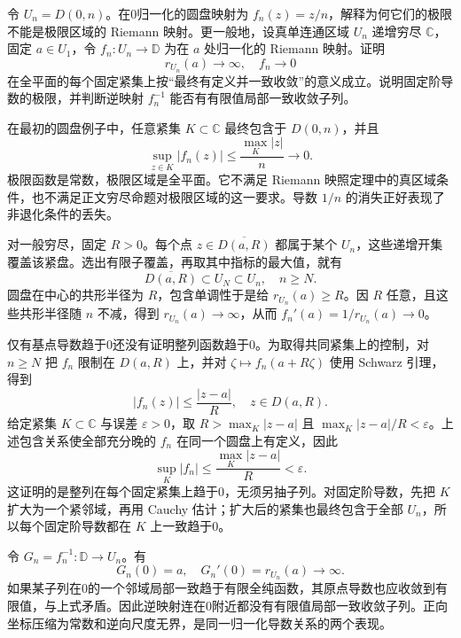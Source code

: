 \begin{exercise}\label{b3:ex:05-6}
令 \(U_n=D(0,n)\)。在0归一化的圆盘映射为 \(f_n(z)=z/n\)，解释为何它们的极限不能是极限区域的 Riemann 映射。更一般地，设真单连通区域 \(U_n\) 递增穷尽 \(\mathbb C\)，固定 \(a\in U_1\)，令 \(f_n:U_n\rightarrow\mathbb D\) 为在 \(a\) 处归一化的 Riemann 映射。证明
\[
 r_{U_n}(a)\longrightarrow\infty,\quad f_n\longrightarrow0
\]
在全平面的每个固定紧集上按“最终有定义并一致收敛”的意义成立。说明固定阶导数的极限，并判断逆映射 \(f_n^{-1}\) 能否有有限值局部一致收敛子列。
\end{exercise}
\begin{solution}
在最初的圆盘例子中，任意紧集 \(K\subset\mathbb C\) 最终包含于 \(D(0,n)\)，并且
\[
 \sup_{z\in K}|f_n(z)|\le\frac{\max_K|z|}{n}\longrightarrow0.
\]
极限函数是常数，极限区域是全平面。它不满足 Riemann 映照定理中的真区域条件，也不满足正文穷尽命题对极限区域的这一要求。导数 \(1/n\) 的消失正好表现了非退化条件的丢失。

对一般穷尽，固定 \(R>0\)。每个点 \(z\in\overline{D(a,R)}\) 都属于某个 \(U_n\)，这些递增开集覆盖该紧盘。选出有限子覆盖，再取其中指标的最大值，就有
\[
 \overline{D(a,R)}\subset U_N\subset U_n,\quad n\ge N.
\]
圆盘在中心的共形半径为 \(R\)，包含单调性于是给
\(r_{U_n}(a)\ge R\)。因 \(R\) 任意，且这些共形半径随 \(n\) 不减，得到 \(r_{U_n}(a)\to\infty\)，从而 \(f_n'(a)=1/r_{U_n}(a)\to0\)。

仅有基点导数趋于0还没有证明整列函数趋于0。为取得共同紧集上的控制，对 \(n\ge N\) 把 \(f_n\) 限制在 \(D(a,R)\) 上，并对 \(\zeta\mapsto f_n(a+R\zeta)\) 使用 Schwarz 引理，得到
\[
 |f_n(z)|\le\frac{|z-a|}{R},\quad z\in D(a,R).
\]
给定紧集 \(K\subset\mathbb C\) 与误差 \(\varepsilon>0\)，取
\(R>\max_K|z-a|\) 且 \(\max_K|z-a|/R<\varepsilon\)。上述包含关系使全部充分晚的 \(f_n\) 在同一个圆盘上有定义，因此
\[
 \sup_K|f_n|\le\frac{\max_K|z-a|}{R}<\varepsilon.
\]
这证明的是整列在每个固定紧集上趋于0，无须另抽子列。对固定阶导数，先把 \(K\) 扩大为一个紧邻域，再用 Cauchy 估计；扩大后的紧集也最终包含于全部 \(U_n\)，所以每个固定阶导数都在 \(K\) 上一致趋于0。

令 \(G_n=f_n^{-1}:\mathbb D\rightarrow U_n\)。有
\[
 G_n(0)=a,\quad G_n'(0)=r_{U_n}(a)\longrightarrow\infty.
\]
如果某子列在0的一个邻域局部一致趋于有限全纯函数，其原点导数也应收敛到有限值，与上式矛盾。因此逆映射连在0附近都没有有限值局部一致收敛子列。正向坐标压缩为常数和逆向尺度无界，是同一归一化导数关系的两个表现。
\end{solution}

